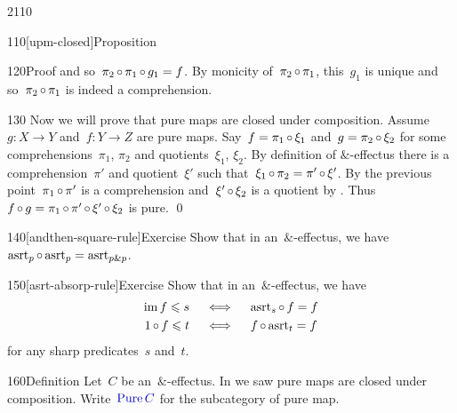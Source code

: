 \begin{parsec}{2110}
\begin{point}{110}[upm-closed]{Proposition}
\begin{point}{120}{Proof}
    and so~$\pi_2 \mathop{\circ} \pi_1 \mathop{\circ} g_1 = f$.
By monicity of~$\pi_2 \mathop{\circ} \pi_1$,
    this~$g_1$ is unique and so~$\pi_2 \mathop{\circ} \pi_1$
    is indeed a comprehension.
\begin{point}{130}%
Now we will prove that pure maps are closed under composition.
Assume~$g\colon X \to Y$ and~$f\colon Y \to Z$ are pure maps.
Say~$f = \pi_1 \mathop{\circ} \xi_1$
    and~$g = \pi_2 \mathop{\circ} \xi_2$
    for some comprehensions~$\pi_1$, $\pi_2$
        and quotients~$\xi_1$, $\xi_2$.
By definition of $\&$-effectus
    there is a comprehension~$\pi'$ and quotient~$\xi'$
    such that~$\xi_1 \mathop{\circ} \pi_2 = \pi' \mathop{\circ} \xi'$.
By the previous point~$\pi_1 \mathop{\circ} \pi'$
    is a comprehension
    and~$\xi' \mathop{\circ} \xi_2$ is a quotient by .
Thus
$f \mathop{\circ} g 
=\pi_1 \mathop{\circ} \pi' \mathop{\circ} \xi' \mathop{\circ} \xi_2$
is pure. \qed
\end{point}
\end{point}
\end{point}
\begin{point}{140}[andthen-square-rule]{Exercise}%
Show that in an~$\&$-effectus,
    we have~$\mathrm{asrt}_p \mathop{\circ} \mathrm{asrt}_p = \mathrm{asrt}_{p \mathbin{\&} p}$.
\end{point}
\begin{point}{150}[asrt-absorp-rule]{Exercise}%
    Show that in an~$\&$-effectus,
    we have
    \begin{align*}
        \operatorname{im} f \leqslant s \quad&\iff\quad  \mathrm{asrt}_s \mathop{\circ} f = f \\
        1 \mathop{\circ} f \leqslant t \quad&\iff\quad  f \mathop{\circ} \mathrm{asrt}_t = f
    \end{align*}
for any sharp predicates~$s$ and~$t$.
\end{point}
\begin{point}{160}{Definition}%
Let~$C$ be an~$\&$-effectus.
In  we saw pure maps are closed under composition.
Write~$\Define{\Pure C}$ for the subcategory
    of pure map.
\end{point}
\end{parsec}

